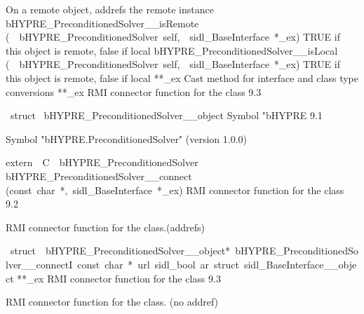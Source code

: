 \documentclass{article}
\begin{document}
\begin{cxxentry}
\begin{cxxnames}
        {
On a remote object, addrefs the remote instance}
        {}
\label{cxx.9.11}
        {bHYPRE\_PreconditionedSolver\_\_isRemote}
        {(\ \ bHYPRE\_PreconditionedSolver\ self,\ \ sidl\_BaseInterface\ *\_ex)}
        {
TRUE if this object is remote, false if local}
        {}
\label{cxx.9.12}
        {bHYPRE\_PreconditionedSolver\_\_isLocal}
        {(\ \ bHYPRE\_PreconditionedSolver\ self,\ \ sidl\_BaseInterface\ *\_ex)}
        {
TRUE if this object is remote, false if local}
        {}
\label{cxx.9.13}
        {**\_ex}
        {}
        {
Cast method for interface and class type conversions}
        {}
\label{cxx.9.14}
        {**\_ex}
        {}
        {
RMI connector function for the class}
        {9.3}
\end{cxxnames}
\begin{cxxvariable}
{\ struct\ }
        {bHYPRE\_PreconditionedSolver\_\_object}
        {}
        {
Symbol "bHYPRE}
        {9.1}
\begin{cxxdoc}

Symbol "bHYPRE.PreconditionedSolver" (version 1.0.0)
\end{cxxdoc}
\end{cxxvariable}
\begin{cxxfunction}
{extern\ \ C\ \ bHYPRE\_PreconditionedSolver\ }
        {bHYPRE\_PreconditionedSolver\_\_connect}
        {(const\ char\ *,\ sidl\_BaseInterface\ *\_ex)}
        {
RMI connector function for the class}
        {9.2}
\begin{cxxdoc}

RMI connector function for the class.(addrefs)
\end{cxxdoc}
\end{cxxfunction}
\begin{cxxvariable}
{\ struct\ \ bHYPRE\_PreconditionedSolver\_\_object*\ bHYPRE\_PreconditionedSolver\_\_connectI\ const\ char\ *\ url\ sidl\_bool\ ar\ struct\ sidl\_BaseInterface\_\_object}
        {**\_ex}
        {}
        {
RMI connector function for the class}
        {9.3}
\begin{cxxdoc}

RMI connector function for the class. (no addref)
\end{cxxdoc}
\end{cxxvariable}
\end{cxxentry}
\end{document}

